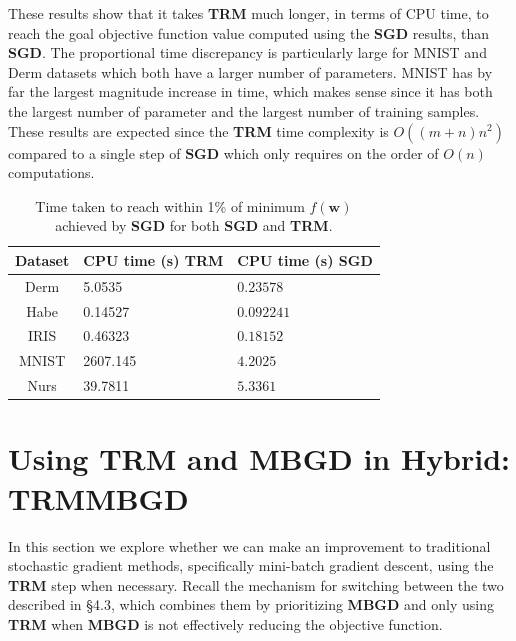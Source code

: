 \documentclass[letterpaper,12pt,titlepage,oneside,final]{book}
\begin{document}
	These results show that it takes \textbf{TRM} much longer, in terms of CPU time,
	to reach the goal objective function value computed using the \textbf{SGD} results, than \textbf{SGD}. The proportional time discrepancy is particularly large for MNIST and Derm datasets which both have a larger number of parameters. MNIST has by far the largest magnitude increase in time, which makes sense since it has both the largest number of parameter and the largest number of training samples.  These results are expected since the \textbf{TRM} time complexity is $O((m + n)n^{2})$ compared to a single step of $\textbf{SGD}$ which only requires on the order of $O(n)$ computations. 
	
	\begin{table}[h] 
		\centering 
		\begin{tabular}{ |c|l|l| } 
			\hline 
			\textbf{Dataset} & CPU time (s) \textbf{TRM} & CPU time (s) \textbf{SGD}\\ 
			\hline 
			Derm &5.0535 & $\mathbf{0.23578}$\\ 
			\hline 
			Habe &0.14527 & $\mathbf{0.092241}$\\ 
			\hline 
			IRIS &0.46323 & $\mathbf{0.18152}$\\ 
			\hline 
			MNIST &2607.145 & $\mathbf{4.2025}$\\ 
			\hline 
			Nurs &39.7811 & $\mathbf{5.3361}$\\ 
			\hline 
		\end{tabular} 
		\caption{Time taken to reach within 1\% of minimum $f(\mathbf{w})$ achieved by \textbf{SGD} for both \textbf{SGD} and \textbf{TRM}.} \label{t_trm_sgd} \end{table}
	
	\section{Using TRM and MBGD in Hybrid: TRMMBGD}
	
	In this section we explore whether we can make an improvement to traditional stochastic gradient methods, specifically mini-batch gradient descent, using the \textbf{TRM} step when necessary. Recall the mechanism for switching between the two described in \S{4.3}, which combines them by prioritizing \textbf{MBGD} and only using \textbf{TRM} when \textbf{MBGD} is not effectively reducing the objective function. 
	
\end{document}

